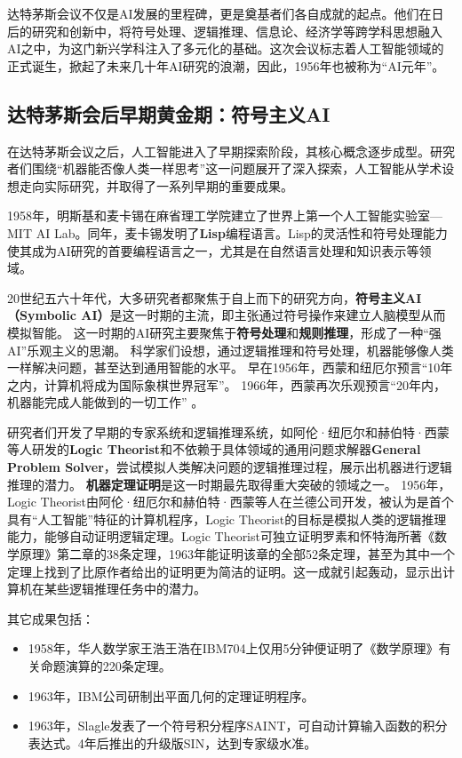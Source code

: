 达特茅斯会议不仅是AI发展的里程碑，更是奠基者们各自成就的起点。他们在日后的研究和创新中，将符号处理、逻辑推理、信息论、经济学等跨学科思想融入AI之中，为这门新兴学科注入了多元化的基础。这次会议标志着人工智能领域的正式诞生，掀起了未来几十年AI研究的浪潮，因此，1956年也被称为“AI元年”。

\subsection{达特茅斯会后早期黄金期：符号主义AI}
在达特茅斯会议之后，人工智能进入了早期探索阶段，其核心概念逐步成型。研究者们围绕“机器能否像人类一样思考”这一问题展开了深入探索，人工智能从学术设想走向实际研究，并取得了一系列早期的重要成果。

1958年，明斯基和麦卡锡在麻省理工学院建立了世界上第一个人工智能实验室---MIT AI Lab。同年，麦卡锡发明了{\bf Lisp}编程语言。Lisp的灵活性和符号处理能力使其成为AI研究的首要编程语言之一，尤其是在自然语言处理和知识表示等领域。

20世纪五六十年代，大多研究者都聚焦于自上而下的研究方向，{\bf 符号主义AI（Symbolic AI）}是这一时期的主流，即主张通过符号操作来建立人脑模型从而模拟智能。
这一时期的AI研究主要聚焦于{\bf 符号处理}和{\bf 规则推理}，形成了一种“强AI”乐观主义的思潮。
科学家们设想，通过逻辑推理和符号处理，机器能够像人类一样解决问题，甚至达到通用智能的水平。
早在1956年，西蒙和纽厄尔预言“10年之内，计算机将成为国际象棋世界冠军”。 1966年，西蒙再次乐观预言“20年内，机器能完成人能做到的一切工作” 。

研究者们开发了早期的专家系统和逻辑推理系统，如阿伦·纽厄尔和赫伯特·西蒙等人研发的{\bf Logic Theorist}和不依赖于具体领域的通用问题求解器{\bf General Problem Solver}，尝试模拟人类解决问题的逻辑推理过程，展示出机器进行逻辑推理的潜力。
{\bf 机器定理证明}是这一时期最先取得重大突破的领域之一。
1956年，Logic Theorist由阿伦·纽厄尔和赫伯特·西蒙等人在兰德公司开发，被认为是首个具有“人工智能”特征的计算机程序，Logic Theorist的目标是模拟人类的逻辑推理能力，能够自动证明逻辑定理。Logic Theorist可独立证明罗素和怀特海所著《数学原理》第二章的38条定理，1963年能证明该章的全部52条定理，甚至为其中一个定理上找到了比原作者给出的证明更为简洁的证明。这一成就引起轰动，显示出计算机在某些逻辑推理任务中的潜力。

其它成果包括：
\begin{itemize}
\item 1958年，华人数学家王浩王浩在IBM704上仅用5分钟便证明了《数学原理》有关命题演算的220条定理。
\item 1963年，IBM公司研制出平面几何的定理证明程序。
\item  1963年，Slagle发表了一个符号积分程序SAINT，可自动计算输入函数的积分表达式。4年后推出的升级版SIN，达到专家级水准。
\end{itemize}

